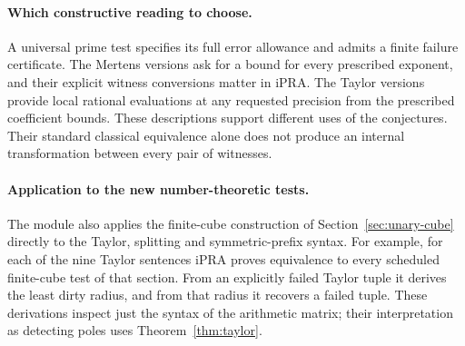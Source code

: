 \paragraph{Which constructive reading to choose.}
A universal prime test specifies its full error allowance and admits a finite failure certificate. The Mertens versions ask for a bound for every prescribed exponent, and their explicit witness conversions matter in iPRA. The Taylor versions provide local rational evaluations at any requested precision from the prescribed coefficient bounds. These descriptions support different uses of the conjectures. Their standard classical equivalence alone does not produce an internal transformation between every pair of witnesses.

\paragraph{Application to the new number-theoretic tests.}
The module  also applies the finite-cube construction of Section~\ref{sec:unary-cube} directly to the Taylor, splitting and symmetric-prefix syntax. For example, for each of the nine Taylor sentences iPRA proves equivalence to every scheduled finite-cube test of that section. From an explicitly failed Taylor tuple it derives the least dirty radius, and from that radius it recovers a failed tuple. These derivations inspect just the syntax of the arithmetic matrix; their interpretation as detecting poles uses Theorem~\ref{thm:taylor}.
